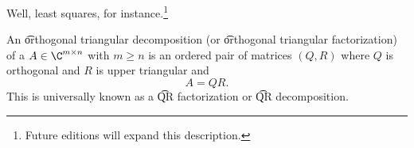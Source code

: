 

Well, least squares, for instance.\footnote{Future editions will expand this description.}


An \t{orthogonal triangular decomposition} (or \t{orthogonal triangular factorization}) of a $A \in \C^{m \times n}$ with $m \geq n$ is an ordered pair of matrices $(Q, R)$ where $Q$ is orthogonal and $R$ is upper triangular and
\[
  A = QR.
\]
This is universally known as a \t{QR factorization} or \t{QR decomposition}.

\blankpage
